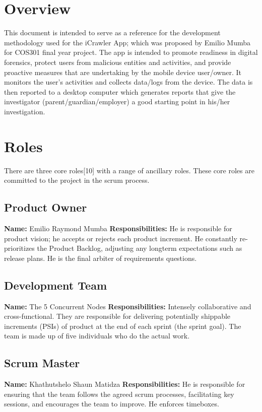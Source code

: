 \documentclass[hidelinks, 12pt, oneside]{article}
\begin{document}
	
	
	\tableofcontents
	\newpage
	
	\section{Overview}
	\begin{flushleft}
		This document is intended to serve as a reference for the development methodology used for the iCrawler App; which was proposed 
	by Emilio Mumba for COS301 final year project.\newline\newline
	The app is intended to promote readiness in digital forensics, protect users from malicious entities and activities, and provide proactive 
	measures that are undertaking by the mobile device user/owner. It monitors the user's activities and collects data/logs from the device. The data
	is then reported to a desktop computer which generates reports that give the investigator (parent/guardian/employer) a good starting point in his/her investigation.\newpage
	\end{flushleft}

	
	\section{Roles}
	There are three core roles[10] with a range of ancillary roles. These core roles are committed to the project in the scrum process.
	\subsection{Product Owner}
	\textbf{Name:} Emilio Raymond Mumba\newline
	\textbf{Responsibilities:} He is responsible for product vision; he accepts or rejects each product increment. He constantly re-prioritizes the Product Backlog, adjusting any longterm expectations such as release plans. He is the final arbiter of requirements questions.
 	\subsection{Development Team}
 	\textbf{Name:} The 5 Concurrent Nodes\newline
	\textbf{Responsibilities:} Intensely collaborative and cross-functional. They are responsible for delivering potentially shippable increments (PSIs) of product at the end of each sprint (the sprint goal). 
	The team
	is made up of five individuals who do the actual work.
	\subsection{Scrum Master}
 	\textbf{Name:} Khathutshelo Shaun Matidza\newline
	\textbf{Responsibilities:} He is responsible for ensuring that the team follows the agreed scrum processes, facilitating key sessions, and encourages 
	the team to improve. He enforces timeboxes.\newpage
	
\end{document}
